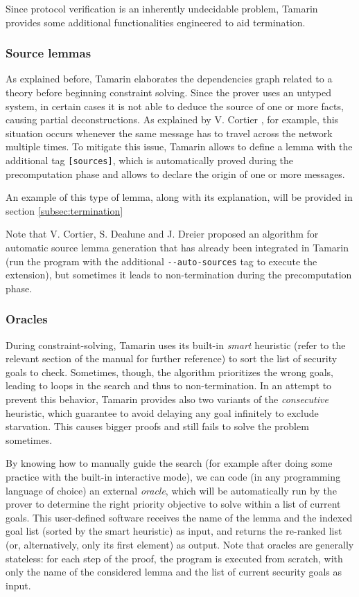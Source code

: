 \documentclass[fleqn,10pt]{SelfArx} %
\begin{document}
Since protocol verification is an inherently undecidable problem, Tamarin provides some additional functionalities engineered to aid termination.

\subsubsection{Source lemmas}

As explained before, Tamarin elaborates the dependencies graph related to a theory before beginning constraint solving. Since the prover uses an untyped system, in certain cases it is not able to deduce the source of one or more facts, causing partial deconstructions. As explained by V. Cortier \cite{autosources}, for example, this situation occurs whenever the same message has to travel across the network multiple times. To mitigate this issue, Tamarin allows to define a lemma with the additional tag \lstinline|[sources]|, which is automatically proved during the precomputation phase and allows to declare the origin of one or more messages.

An example of this type of lemma, along with its explanation, will be provided in section \ref{subsec:termination}

Note that V. Cortier, S. Dealune and J. Dreier proposed an algorithm for automatic source lemma generation \cite{autosources} that has already been integrated in Tamarin (run the program with the additional \lstinline|--auto-sources| tag to execute the extension), but sometimes it leads to non-termination during the precomputation phase.

\subsubsection{Oracles}

During constraint-solving, Tamarin uses its built-in \textit{smart} heuristic (refer to the relevant section of the manual \cite{tamarinManual} for further reference) to sort the list of security goals to check. Sometimes, though, the algorithm prioritizes the wrong goals, leading to loops in the search and thus to non-termination. In an attempt to prevent this behavior, Tamarin provides also two variants of the \textit{consecutive} heuristic, which guarantee to avoid delaying any goal infinitely to exclude starvation. This causes bigger proofs and still fails to solve the problem sometimes.

By knowing how to manually guide the search (for example after doing some practice with the built-in interactive mode), we can code (in any programming language of choice) an external \textit{oracle}, which will be automatically run by the prover to determine the right priority objective to solve within a list of current goals. This user-defined software receives the name of the lemma and the indexed goal list (sorted by the smart heuristic) as input, and returns the re-ranked list (or, alternatively, only its first element) as output. Note that oracles are generally stateless: for each step of the proof, the program is executed from scratch, with only the name of the considered lemma and the list of current security goals as input.
\end{document}
